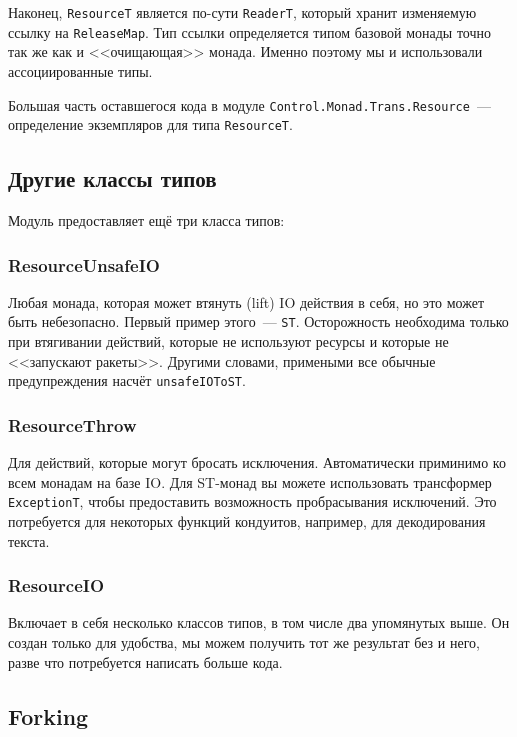 {Наконец, \lstinline'ResourceT' является по-сути \lstinline'ReaderT', который
хранит изменяемую
ссылку на \lstinline'ReleaseMap'. Тип ссылки определяется типом базовой монады точно так же как и <<очищающая>> монада. Именно поэтому мы и использовали ассоциированные типы.

Большая часть оставшегося кода в модуле \lstinline'Control.Monad.Trans.Resource'~---
определение экземпляров для типа \lstinline'ResourceT'.

\subsection{Другие классы типов}

Модуль предоставляет ещё три класса типов:
   
\subsubsection{ResourceUnsafeIO}
Любая монада, которая может втянуть (lift) IO действия в себя, но это может быть небезопасно.
Первый пример этого~--- \lstinline'ST'. Осторожность необходима только при втягивании действий, которые не используют ресурсы и которые не <<запускают ракеты>>.
Другими словами, примеными все обычные предупреждения насчёт \lstinline'unsafeIOToST'.
  
\subsubsection{ResourceThrow}

Для действий, которые могут бросать исключения. Автоматически приминимо ко всем
монадам на базе IO. Для ST-монад вы можете использовать трансформер
\lstinline'ExceptionT', чтобы
предоставить возможность пробрасывания исключений. Это потребуется для некоторых функций
кондуитов, например, для декодирования текста.
   
\subsubsection{ResourceIO}

Включает в себя несколько классов типов, в том числе два
упомянутых выше. Он создан только для удобства, мы можем получить тот же результат без и
него, разве что потребуется написать больше кода.
   
\subsection{Forking}

}
